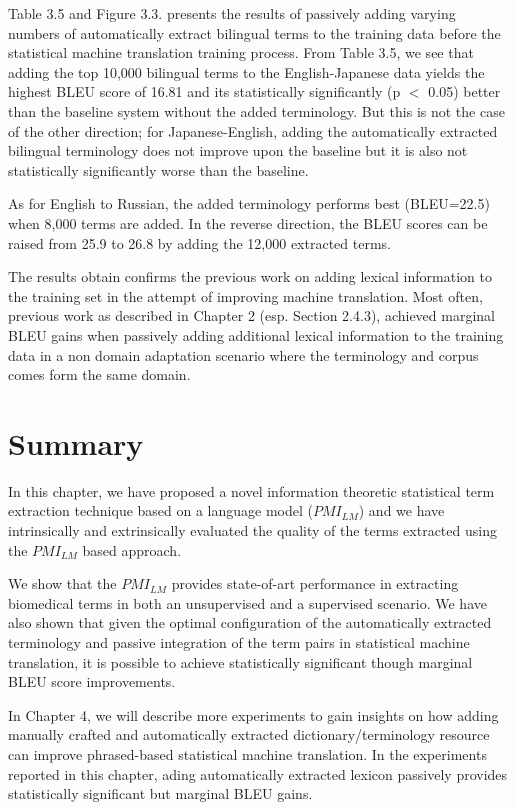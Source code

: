 Table 3.5 and Figure 3.3. presents the results of passively adding varying numbers of  automatically extract bilingual terms to the training data before the statistical machine translation training process. From Table 3.5, we see that adding the top 10,000 bilingual terms to the English-Japanese data yields the highest BLEU score of 16.81 and its statistically significantly (p $<$ 0.05) better than  the baseline system without the added terminology. But this is not the case of the other direction; for Japanese-English, adding the automatically extracted bilingual terminology does not improve upon the baseline but it is also not statistically significantly worse than the baseline.

As for English to Russian, the added terminology performs best (BLEU=22.5) when 8,000 terms are added. In the reverse direction, the BLEU scores can be raised from 25.9 to 26.8 by adding the 12,000 extracted terms.

The results obtain confirms the previous work on adding lexical information to the training set in the attempt of improving machine translation. Most often, previous work as described in Chapter 2 (esp. Section 2.4.3), achieved marginal BLEU gains when passively adding additional lexical information to the training data in a non domain adaptation scenario where the terminology and corpus comes form the same domain.

\section{Summary}

In this chapter, we have proposed a novel information theoretic statistical term extraction technique based on a language model ($PMI_{LM}$) and we have intrinsically and extrinsically evaluated the quality of the terms extracted using the $PMI_{LM}$ based approach.

We show that the $PMI_{LM}$ provides state-of-art performance in extracting biomedical terms in both an unsupervised and a supervised scenario. We have also shown that given the optimal configuration of the automatically extracted terminology and passive integration of the term pairs in statistical machine translation, it is possible to achieve statistically significant though marginal BLEU score improvements.

In Chapter 4, we will describe more experiments to gain insights on how adding manually crafted and automatically extracted dictionary/terminology resource can improve phrased-based statistical machine translation. In the experiments reported in this chapter, ading automatically extracted lexicon passively provides statistically significant but marginal BLEU gains.   
